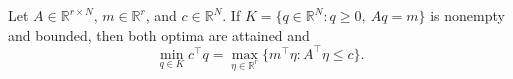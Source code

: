 Let \(A\in\mathbb R^{r\times N}\), \(m\in\mathbb R^r\), and \(c\in\mathbb R^N\). If \(K=\{q\in\mathbb R^N:q\geq0,\ Aq=m\}\) is nonempty and bounded, then both optima are attained and
\[
 \min_{q\in K}c^\top q
 =\max_{\eta\in\mathbb R^r}\{m^\top\eta:A^\top\eta\leq c\}.
\]